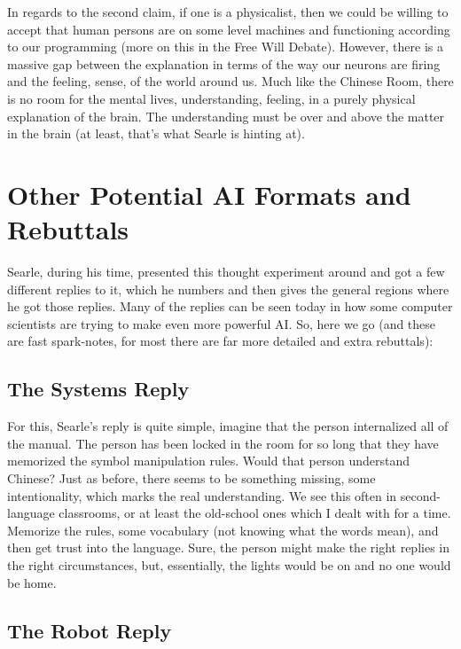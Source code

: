 In regards to the second claim, if one is a physicalist, then we could be willing to accept that human persons are on some level machines and functioning according to our programming (more on this in the Free Will Debate). However, there is a massive gap between the explanation in terms of the way our neurons are firing and the feeling, sense, of the world around us. Much like the Chinese Room, there is no room for the mental lives, understanding, feeling, in a purely physical explanation of the brain. The understanding must be over and above the matter in the brain (at least, that's what Searle is hinting at). 

\section{Other Potential AI Formats and Rebuttals}

Searle, during his time, presented this thought experiment around and got a few different replies to it, which he numbers and then gives the general regions where he got those replies. Many of the replies can be seen today in how some computer scientists are trying to make even more powerful AI.  So, here we go (and these are fast spark-notes, for most there are far more detailed and extra rebuttals):
\subsection{The Systems Reply}

    For this,  Searle's reply is quite simple, imagine that the person internalized all of the manual. The person has been locked in the room for so long that they have memorized the symbol manipulation rules. Would that person understand Chinese? Just as before, there seems to be something missing, some intentionality, which marks the real understanding. We see this often in second-language classrooms, or at least the old-school ones which I dealt with for a time. Memorize the rules, some vocabulary  (not knowing what the words mean), and then get trust into the language. Sure, the person might make the right replies in the right circumstances, but, essentially, the lights would be on and no one would be home.
    
\subsection{The Robot Reply}

